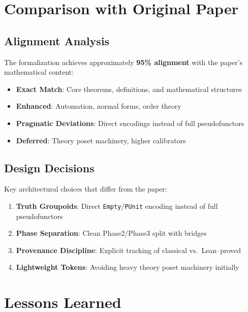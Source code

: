 \documentclass[11pt]{article}
\theoremstyle{definition}
\theoremstyle{remark}
\newcommand{\lean}[1]{\texttt{#1}}
\begin{document}
\section{Comparison with Original Paper}

\subsection{Alignment Analysis}

The formalization achieves approximately \textbf{95\% alignment} with the paper's mathematical content:

\begin{itemize}
\item \textbf{Exact Match}: Core theorems, definitions, and mathematical structures
\item \textbf{Enhanced}: Automation, normal forms, order theory
\item \textbf{Pragmatic Deviations}: Direct encodings instead of full pseudofunctors
\item \textbf{Deferred}: Theory poset machinery, higher calibrators
\end{itemize}

\subsection{Design Decisions}

Key architectural choices that differ from the paper:

\begin{enumerate}
\item \textbf{Truth Groupoids}: Direct \lean{Empty}/\lean{PUnit} encoding instead of full pseudofunctors
\item \textbf{Phase Separation}: Clean Phase2/Phase3 split with bridges
\item \textbf{Provenance Discipline}: Explicit tracking of classical vs.\ Lean--proved
\item \textbf{Lightweight Tokens}: Avoiding heavy theory poset machinery initially
\end{enumerate}

\section{Lessons Learned}
\end{document}
